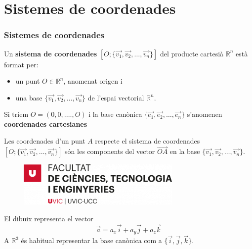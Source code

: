 \documentclass{beamer}
\begin{document}
\section{Sistemes de coordenades}
\begin{frame}
  \frametitle{Sistemes de coordenades}
  \begin{definicio}
    Un {\bf sistema de coordenades} $[O;\{\overrightarrow{v_1},\overrightarrow{v_2}, \ldots , \overrightarrow{v_n}\}]$ del producte cartesià $\mathbb{R}^n$ està format per:
    \begin{itemize}
      \item un punt $O\in\mathbb{R}^n$, anomenat origen i
      \item una base $\{\overrightarrow{v_1},\overrightarrow{v_2}, \ldots , \overrightarrow{v_n}\}$ de l'espai vectorial $\mathbb{R}^n$.
    \end{itemize}
  \end{definicio}
  Si triem $O=(0,0,.\ldots,O)$ i la base canònica $\{\overrightarrow{e_1},\overrightarrow{e_2}, \ldots , \overrightarrow{e_n}\}$ s'anomenen {\bf coordenades cartesianes}

  Les coordenades d'un punt $A$ respecte el sistema de coordenades $[O;\{\overrightarrow{v_1},\overrightarrow{v_2}, \ldots , \overrightarrow{v_n}\}]$ són les components del vector $\overrightarrow{OA}$ en la base $\{\overrightarrow{v_1},\overrightarrow{v_2}, \ldots , \overrightarrow{v_n}\}$.
\end{frame}
\begin{frame}
\begin{figure}
\includegraphics[width=0.4\linewidth]{FCTE}
\end{figure}
El dibuix representa el vector
\[
\vec{a}=a_x \vec{i} + a_y \vec{j} + a_z \vec{k}
\]
A $\mathbb{R}^3$ és habitual representar la base canònica com a $\{\vec{i},\vec{j},\vec{k}\}$.
\end{frame}
\end{document}
